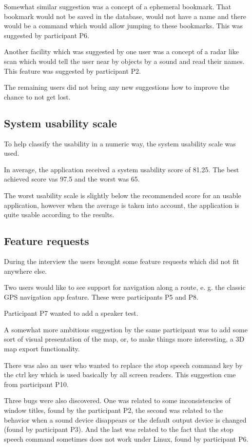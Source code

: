 \documentclass[nolof,digital]{fithesis3}
\begin{document}
Somewhat similar suggestion was a concept of a ephemeral bookmark. That bookmark would not be saved in the database, would not have a name and there would be a command which would allow jumping to these bookmarks. This was suggested by participant P6.

Another facility which was suggested by one user was a concept of a radar like scan which would tell the user near by objects by a sound and read their names. This feature was suggested by participant P2.

The  remaining users did not bring any new suggestions how to improve the chance to not get lost.
\subsection{System usability scale}
To help classify the usability in a numeric way, the system usability scale was used.

In average, the application received a system usability score of 81.25. The best achieved score vas 97.5 and the worst was 65.

The worst usability scale is slightly below the recommended score for an usable application, however when the average is taken into account, the application is quite usable according to the results.

\subsection{Feature requests}
During the interview the users brought some feature requests which did not fit anywhere else.

Two users would like to see support for navigation along a route, e. g. the classic GPS navigation app feature. These were participants P5 and P8.

Participant P7 wanted to add a speaker test.

A somewhat more ambitious suggestion by the same participant was to add some sort of visual presentation of the map, or, to make things more interesting, a 3D map export functionality.

There was also an user who wanted to replace the stop speech command key by the ctrl key which is used basically by all screen readers. This suggestion cme from participant P10.

Three bugs were also discovered. One was related to some inconsistencies of window titles, found by the participant P2, the second was related to the behavior when a sound device disappears or the default output device is changed (found by participant P3). And the last was related to the fact that the stop speech command sometimes does not work under Linux, found by participant P6.
\end{document}
